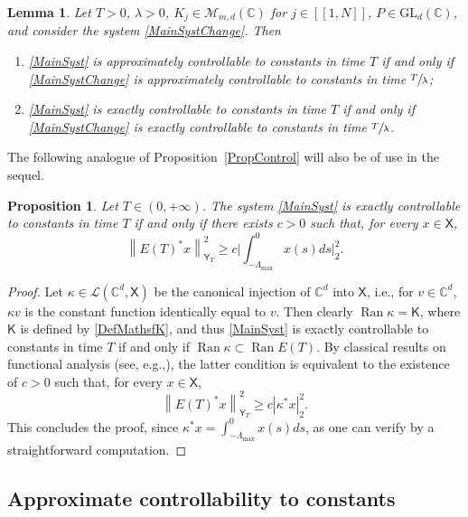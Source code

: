 \documentclass[10pt]{article}
\newcommand{\ie}{i.e.,\xspace}
\newcommand{\eg}{e.g.,\xspace}
\renewcommand{\eg}{e.g.,\xspace}
\newcommand{\llbracket}{[\![}
\newcommand{\rrbracket}{]\!]}
\theoremstyle{plain}
\newtheorem{lemm}[theo]{Lemma}
\newtheorem{prop}[theo]{Proposition}
\theoremstyle{definition}
\DeclareMathOperator{\range}{Ran}
\newcommand{\norm}[1]{\left\lVert #1\right\lVert}
\newcommand{\abs}[1]{\left\lvert #1\right \rvert}
\newcommand{\bgabs}[1]{\biggl\lvert #1\biggr \rvert}
\numberwithin{equation}{section}\numberwithin{figure}{section}\emergencystretch=3em
\begin{document}
\begin{lemm}
\label{LemmInvariantConstants}
Let $T > 0$, $\lambda > 0$, $K_j \in \mathcal M_{m, d}(\mathbb C)$ for $j \in \llbracket 1, N\rrbracket$, $P \in \mathrm{GL}_d(\mathbb C)$, and consider the system \eqref{MainSystChange}. Then
\begin{enumerate}
\item\label{ApproxContrlConstIff} \eqref{MainSyst} is approximately controllable to constants in time $T$ if and only if \eqref{MainSystChange} is approximately controllable to constants in time $\sfrac{T}{\lambda}$;

\item\label{ExactContrlConstIff} \eqref{MainSyst} is exactly controllable to constants in time $T$ if and only if \eqref{MainSystChange} is exactly controllable to constants in time $\sfrac{T}{\lambda}$.
\end{enumerate}
\end{lemm}

The following analogue of Proposition~\ref{PropControl} will also be of use in the sequel.

\begin{prop}
\label{PropInegObservConst}
Let $T \in (0, +\infty)$. The system \eqref{MainSyst} is exactly controllable to constants in time $T$ if and only if there exists $c > 0$ such that, for every $x \in \mathsf X$,
\[
\norm{E(T)^\ast x}_{\mathsf Y_T}^2 \geq c \bgabs{\int_{-\Lambda_{\max}}^0 x(s) ds}_2^2.
\]
\end{prop}

\begin{proof}
Let $\kappa \in \mathcal L(\mathbb C^d, \mathsf X)$ be the canonical injection of $\mathbb C^d$ into $\mathsf X$, \ie for $v \in \mathbb C^d$, $\kappa v$ is the constant function identically equal to $v$. Then clearly $\range \kappa = \mathsf K$, where $\mathsf K$ is defined by \eqref{DefMathsfK}, and thus \eqref{MainSyst} is exactly controllable to constants in time $T$ if and only if $\range \kappa \subset \range E(T)$. By classical results on functional analysis (see, \eg \cite[Lem.\,2.48]{Coron2007Control}), the latter condition is equivalent to the existence of $c > 0$ such that, for every $x \in \mathsf X$,
\[
\norm{E(T)^\ast x}_{\mathsf Y_T}^2 \geq c \abs{\kappa^\ast x}_2^2.
\]
This concludes the proof, since $\kappa^\ast x = \int_{-\Lambda_{\max}}^0 x(s) ds$, as one can verify by a straightforward computation.
\end{proof}

\subsection{Approximate controllability to constants}
\label{SecApproxToConst}
\end{document}
